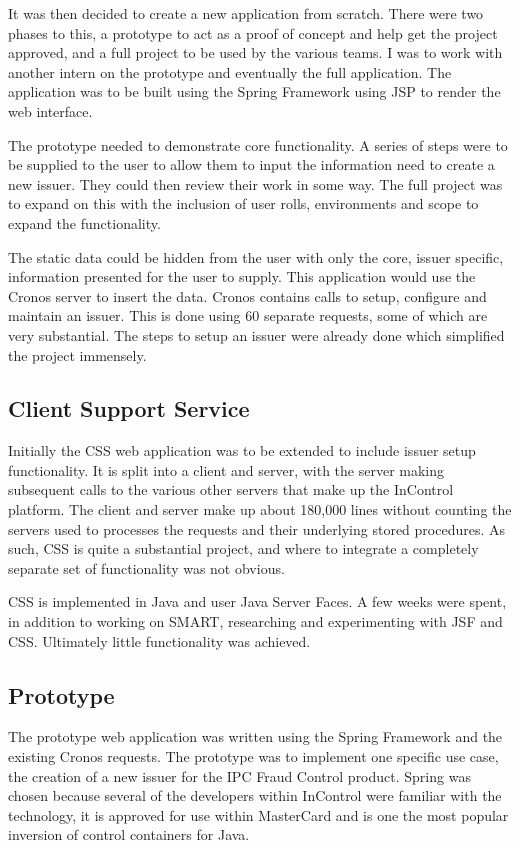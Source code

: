 \documentclass[a4paper, 11pt, titlepage]{article}
\begin{document}
It was then decided to create a new application from scratch. There were two phases to this, a prototype to act as a proof of concept and help get the project approved, and a full project to be used by the various teams. I was to work with another intern on the prototype and eventually the full application. The application was to be built using the Spring Framework using JSP to render the web interface. 
 
The prototype needed to demonstrate core functionality. A series of steps were to be supplied to the user to allow them to input the information need to create a new issuer. They could then review their work in some way. The full project was to expand on this with the inclusion of user rolls, environments and scope to expand the functionality.  

The static data could be hidden from the user with only the core, issuer specific, information presented for the user to supply. This application would use the Cronos server to insert the data. Cronos contains calls to setup, configure and maintain an issuer. This is done using 60 separate requests, some of which are very substantial. The steps to setup an issuer were already done which simplified the project immensely. 


\subsection{Client Support Service} 
 
Initially the CSS web application was to be extended to include issuer setup functionality. It is split into a client and server, with the server making subsequent calls to the various other servers that make up the InControl platform. The client and server make up about 180,000 lines without counting the servers used to processes the requests and their underlying stored procedures. As such, CSS is quite a substantial project, and where to integrate a completely separate set of functionality was not obvious.

CSS is implemented in Java and user Java Server Faces. A few weeks were spent, in addition to working on SMART, researching and experimenting with JSF and CSS. Ultimately little functionality was achieved.
 
\subsection{Prototype} 
 
The prototype web application was written using the Spring Framework \cite{Spring} and the existing Cronos requests. The prototype was to implement one specific use case, the creation of a new issuer for the IPC Fraud Control product. \pageref{fraud_control}
Spring was chosen because several of the developers within InControl were familiar with the technology, it is approved for use within MasterCard and is one the most popular inversion of control containers for Java. 
\end{document}

